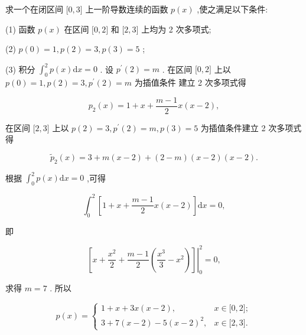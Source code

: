 \begin{tcolorbox}[enhanced,colback=10,colframe=9,breakable,coltitle=green!25!black,title=2024]
求一个在闭区间 $\lbrack 0,3\rbrack$ 上一阶导数连续的函数 $p(x)$ ,使之满足以下条件:

(1) 函数 $p(x)$ 在区间 $\lbrack 0,2\rbrack$ 和 $\lbrack 2,3\rbrack$ 上均为 2 次多项式;

(2) $p(0) = 1,p(2) = 3,p(3) = 5$ ;

(3) 积分 ${{\int}}_{0}^{2}p(x)\mathrm{d}x = 0$ .
\tcblower
 设 $p^{{\prime}}(2) = m$ . 在区间 $\lbrack 0,2\rbrack$ 上以 $p(0) = 1,p(2) = 3,p^{{\prime}}(2) = m$ 为插值条件 建立 2 次多项式得

$$p_{2}(x) = 1 + x + \frac{m {-} 1}{2}x(x {-} 2),$$

在区间 $\lbrack 2,3\rbrack$ 上以 $p(2) = 3,p^{{\prime}}(2) = m,p(3) = 5$ 为插值条件建立 2 次多项式得

$${\widetilde{p}}_{2}(x) = 3 + m(x {-} 2) + (2 {-} m)(x {-} 2)(x {-} 2).$$

根据 ${{\int}}_{0}^{2}p(x)\mathrm{d}x = 0$ ,可得

$${{\int}}_{0}^{2}\left\lbrack 1 + x + \frac{m {-} 1}{2}x(x {-} 2) \right\rbrack\mathrm{d}x = 0,$$

即

$${\left. \left\lbrack x + \frac{x^{2}}{2} + \frac{m {-} 1}{2}\left( \frac{x^{3}}{3} {-} x^{2} \right) \right\rbrack \right|}_{0}^{2} = 0,$$

求得 $m = 7$ . 所以

$$p(x) = \begin{cases} 1 + x + 3x(x {-} 2), & x {\in} \lbrack 0,2\rbrack; \\ 3 + 7(x {-} 2) {-} 5{(x {-} 2)}^{2}, & x {\in} \lbrack 2,3\rbrack. \end{cases}$$
\end{tcolorbox}



